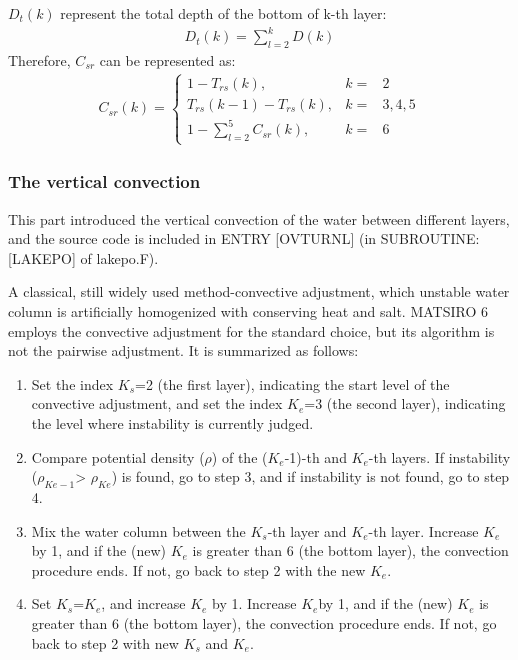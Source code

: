 \(D_{t}(k)\) represent the total depth of the bottom of k-th layer: \begin{eqnarray}
D_{t}(k)=\sum_{l=2}^{k}D(k)
\end{eqnarray} Therefore, \(C_{sr}\) can be represented as: \begin{eqnarray}
C_{sr}(k)=\left\{\begin{matrix}
1-T_{rs}(k), &k=&2\\T_{rs}(k-1)-T_{rs}(k), &k=&3, 4, 5
\\ 1-\sum_{l=2}^{5}C_{sr}(k), &k=&6
\end{matrix}\right.
\end{eqnarray}

\subsubsection{The vertical convection}\label{the-vertical-convection}

This part introduced the vertical convection of the water between different layers, and the source code is included in ENTRY {[}OVTURNL{]} (in SUBROUTINE: {[}LAKEPO{]} of lakepo.F).

A classical, still widely used method-convective adjustment, which unstable water column is artificially homogenized with conserving heat and salt. MATSIRO 6 employs the convective adjustment for the
standard choice, but its algorithm is not the pairwise adjustment. It is summarized as follows:

\begin{enumerate}
\def\labelenumi{(\arabic{enumi})}
\item
  Set the index \(K_{s}\)=2 (the first layer), indicating the start level of the convective adjustment, and set the index \(K_{e}\)=3 (the second layer), indicating the level where instability is
  currently judged.
\item
  Compare potential density (\(\rho\)) of the (\(K_{e}\)-1)-th and \(K_{e}\)-th layers. If instability (\(\rho_{Ke-1}\)\textgreater{} \(\rho_{Ke}\)) is found, go to step 3, and if instability is not
  found, go to step 4.
\item
  Mix the water column between the \(K_{s}\)-th layer and \(K_{e}\)-th layer. Increase \(K_{e}\) by 1, and if the (new) \(K_{e}\) is greater than 6 (the bottom layer), the convection procedure ends.
  If not, go back to step 2 with the new \(K_{e}\).
\item
  Set \(K_{s}\)=\(K_{e}\), and increase \(K_{e}\) by 1. Increase \(K_{e}\)by 1, and if the (new) \(K_{e}\) is greater than 6 (the bottom layer), the convection procedure ends. If not, go back to step
  2 with new \(K_{s}\) and \(K_{e}\).
\end{enumerate}

